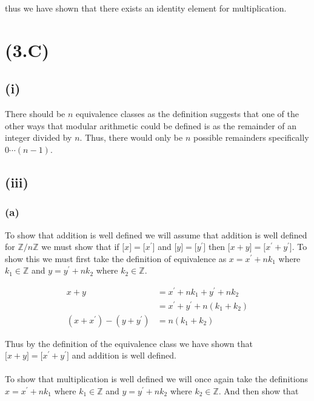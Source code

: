 \documentclass{article}
\begin{document}
    \noindent thus we have shown that there exists an identity element for multiplication.

  
  \section*{(3.C)}
    \subsection*{(i)}
      There should be $n$ equivalence classes as the definition suggests that one of the other ways that modular arithmetic could be defined is as the remainder of an integer divided by $n$. Thus, there would only be $n$ possible remainders specifically $0 \cdots (n-1)$.

    \subsection*{(iii)}
      \subsubsection*{(a)}
        To show that addition is well defined we will assume that addition is well defined for $\mathbb{Z}/n\mathbb{Z}$ we must show that if $\lbrack x \rbrack = \lbrack x^{\prime} \rbrack$ and $\lbrack y \rbrack = \lbrack y^{\prime} \rbrack$ then $\lbrack x+y \rbrack = \lbrack x^{\prime} + y^{\prime} \rbrack$. To show this we must first take the definition of equivalence as $x = x^{\prime} + nk_1$ where $k_1 \in \mathbb{Z}$ and $y = y^{\prime} + nk_2$ where $k_2 \in \mathbb{Z}$. 

        \begin{equation*}
          \begin{split}
            x + y &= x^{\prime} + nk_1 + y^{\prime} + nk_2\\
            &= x^{\prime} + y^{\prime} + n(k_1 + k_2)\\
            (x + x^{\prime}) - (y + y^{\prime}) &= n(k_1+k_2)
          \end{split}
        \end{equation*}

        Thus by the definition of the equivalence class we have shown that $\lbrack x+y \rbrack = \lbrack x^{\prime} + y^{\prime} \rbrack$ and addition is well defined.

        \paragraph{}
        To show that multiplication is well defined we will once again take the definitions $x = x^{\prime} + nk_1$ where $k_1 \in \mathbb{Z}$ and $y = y^{\prime} + nk_2$ where $k_2 \in \mathbb{Z}$. And then show that 
\end{document}
